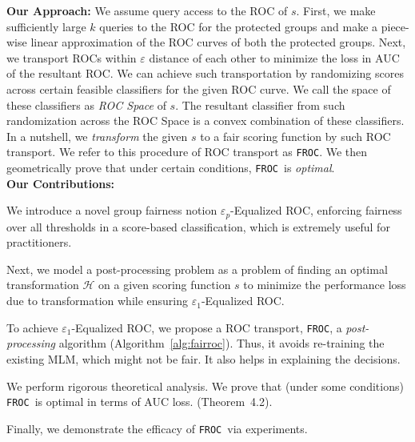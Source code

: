 \documentclass{article}
\newcommand{\ouralgo}{\texttt{FROC}}
\newcommand{\ourdef}{-Equalized ROC}
\begin{document}
\noindent\textbf{Our Approach: }
We assume query access to the ROC of $s$. First, we make sufficiently large $k$ queries to the ROC for the protected groups and make a piece-wise linear approximation of the ROC curves of both the protected groups. Next, we transport ROCs within $\varepsilon$ distance of each other to minimize the loss in AUC of the resultant ROC. We can achieve such transportation by randomizing scores across certain feasible classifiers for the given ROC curve. We call the space of these classifiers as \emph{ROC Space} of $s$. The resultant classifier from such randomization across the ROC Space is a convex combination of these classifiers. In a nutshell, we \emph{transform} the given $s$ to a fair scoring function by such ROC transport. We refer to this procedure of ROC transport as \ouralgo. We then geometrically prove that under certain conditions, \ouralgo\ is \emph{optimal}.\\
\noindent\textbf{Our Contributions: }
\begin{compactitem}
    \item We introduce a novel group fairness notion $\varepsilon_p$\ourdef, enforcing fairness over all thresholds in a score-based classification, {which is extremely useful for practitioners.}
    \item Next, we model a post-processing problem as a problem of finding an optimal transformation $\mathcal{H}$ on a given scoring function $s$ to minimize the performance loss due to transformation while ensuring $\varepsilon_1$\ourdef.  
    \item To achieve $\varepsilon_1$\ourdef, we propose a ROC transport, \ouralgo, a \emph{post-processing} algorithm  (Algorithm~\ref{alg:fairroc}). {Thus, it avoids re-training the existing MLM, which might not be fair. It also helps in explaining the decisions.}
    \item We perform rigorous theoretical analysis. We prove that (under some conditions) \ouralgo\ is optimal in terms of AUC loss. (Theorem~4.2).
    \item Finally, we demonstrate the efficacy of \ouralgo\ via experiments.
\end{compactitem}


\end{document}
